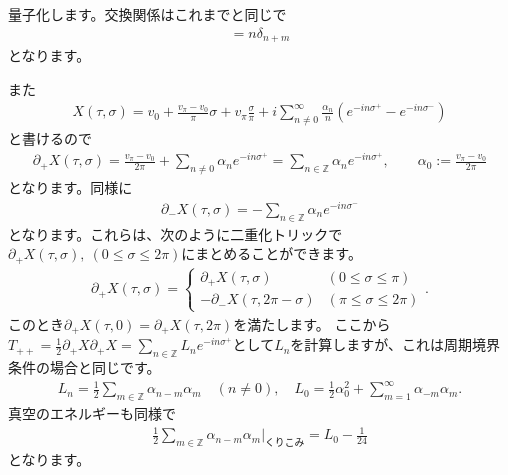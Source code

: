\documentclass[report,paper=a4, fontsize=12pt, line_length=16cm, number_of_lines=33,dvipdfmx]{jlreq}
\numberwithin{equation}{chapter}
\numberwithin{equation}{section}
\newcommand{\Zb}{\mathbb{Z}}
\newcommand{\del}{\partial}
\begin{document}
量子化します。交換関係はこれまでと同じで
\begin{align}
  [\alpha_n,\alpha_m]=n\delta_{n+m}
\end{align}
となります。

また
\begin{align}
  X(\tau,\sigma)=v_{0}+\frac{v_{\pi}-v_{0}}{\pi}\sigma+v_{\pi}\frac{\sigma}{\pi}+i\sum_{n\ne 0}^{\infty}\frac{\alpha_{n}}{n}\left( e^{-in\sigma^{+}}-e^{-in\sigma^{-}} \right)
\end{align}
と書けるので
\begin{align}
  \del_{+}X(\tau,\sigma)=\frac{v_{\pi}-v_{0}}{2\pi}+\sum_{n\ne 0}\alpha_{n}e^{-in\sigma^{+}}=\sum_{n\in \Zb}\alpha_{n}e^{-in\sigma^{+}},\qquad \alpha_{0}:=\frac{v_{\pi}-v_{0}}{2\pi}
  \label{DDmodeexp}
\end{align}
となります。同様に
\begin{align}
  \del_{-}X(\tau,\sigma)=-\sum_{n\in \Zb}\alpha_{n}e^{-in\sigma^{-}}
\end{align}
となります。これらは、次のように二重化トリックで$\del_{+}X(\tau,\sigma),\ (0\le \sigma \le 2\pi)$にまとめることができます。
\begin{align}
  \del_{+}X(\tau,\sigma)=
  \begin{cases}
    \del_{+}X(\tau,\sigma)& (0\le \sigma \le \pi)\\
    -\del_{-}X(\tau,2\pi-\sigma) & (\pi\le \sigma \le 2\pi)
  \end{cases}.
\end{align}
このとき$\del_{+}X(\tau,0)=\del_{+}X(\tau,2\pi)$を満たします。
ここから$T_{++}=\frac12\del_{+}X\del_{+}X=\sum_{n\in \Zb}L_{n}e^{-in\sigma^{+}}$として$L_n$を計算しますが、これは周期境界条件の場合と同じです。
\begin{align}
  L_{n}=\frac12 \sum_{m\in\Zb}\alpha_{n-m}\alpha_{m}\quad (n\ne 0),\quad
  L_{0}=\frac12 \alpha_{0}^2+\sum_{m=1}^{\infty}\alpha_{-m}\alpha_{m}.
\end{align}
真空のエネルギーも同様で
\begin{align}
  \frac12 \sum_{m\in\Zb}\alpha_{n-m}\alpha_{m}\Bigg|_{\text{くりこみ}}=L_0-\frac{1}{24}
\end{align}
となります。
\end{document}
